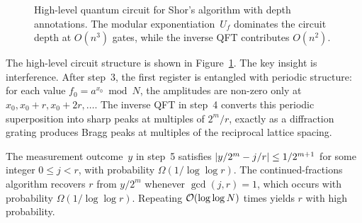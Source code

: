 \begin{figure}[t]
\centering
{}
\caption{High-level quantum circuit for Shor's algorithm with depth annotations.  The modular exponentiation~$U_f$ dominates the circuit depth at $O(n^3)$ gates, while the inverse QFT contributes $O(n^2)$.}
\label{fig:ch04-shor-circuit}
\end{figure}

The high-level circuit structure is shown in Figure~\ref{fig:ch04-shor-circuit}.  The key insight is interference.  After step~3, the first register is entangled with periodic structure: for each value $f_0 = a^{x_0} \bmod N$, the amplitudes are non-zero only at $x_0, x_0 + r, x_0 + 2r, \ldots$.  The inverse QFT in step~4 converts this periodic superposition into sharp peaks at multiples of $2^m/r$, exactly as a diffraction grating produces Bragg peaks at multiples of the reciprocal lattice spacing.

\begin{theorem}
\label{thm:shor-correctness}
The measurement outcome~$y$ in step~5 satisfies $\left\lvert y/2^m - j/r \right\rvert \leq 1/2^{m+1}$ for some integer $0 \leq j < r$, with probability $\Omega(1/\log\log r)$.  The continued-fractions algorithm recovers $r$ from $y/2^m$ whenever $\gcd(j,r) = 1$, which occurs with probability $\Omega(1/\log\log r)$.  Repeating $\mathcal{O}(\log\log N)$ times yields $r$ with high probability.
\end{theorem}

